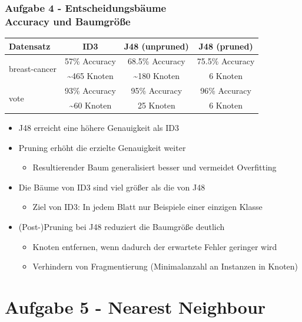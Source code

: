 \documentclass[accentcolor=tud6b,colorbacktitle,inverttitle,landscape,german,presentation,t]{tudbeamer}
\begin{document}
    \begin{frame}[t]
    \frametitle{Aufgabe 4 - Entscheidungsbäume\\ Accuracy und Baumgröße}
        \begin{tabular}[htbp]{l||c|c|c}
            Datensatz & ID3 & J48 (unpruned) & J48 (pruned) \\
            \hline
            \hline
            \multirow{2}{*}{breast-cancer} & 57\% Accuracy & 68.5\% Accuracy & 75.5\% Accuracy \\
            & \textasciitilde 465 Knoten & \textasciitilde 180 Knoten & 6 Knoten \\
            \hline
            \multirow{2}{*}{vote} & 93\% Accuracy & 95\% Accuracy & 96\% Accuracy \\
            & \textasciitilde 60 Knoten & 25 Knoten & 6 Knoten \\
        \end{tabular}
        \vfill
        \begin{itemize}
            \item J48 erreicht eine höhere Genauigkeit als ID3\\
            \item Pruning erhöht die erzielte Genauigkeit weiter
\begin{itemize}
                \item Resultierender Baum generalisiert besser und vermeidet Overfitting
            \end{itemize}
            \item Die Bäume von ID3 sind viel größer als die von J48
\begin{itemize}
                \item Ziel von ID3: In jedem Blatt nur Beispiele einer einzigen Klasse 
            \end{itemize} 
            \item (Post-)Pruning bei J48 reduziert die Baumgröße deutlich
            \begin{itemize}
                \item Knoten entfernen, wenn dadurch der erwartete Fehler geringer wird
                \item Verhindern von Fragmentierung (Minimalanzahl an Instanzen in Knoten)
            \end{itemize}
        \end{itemize}
    \end{frame}
    
    \section{Aufgabe 5 - Nearest Neighbour}
    
\end{document}
